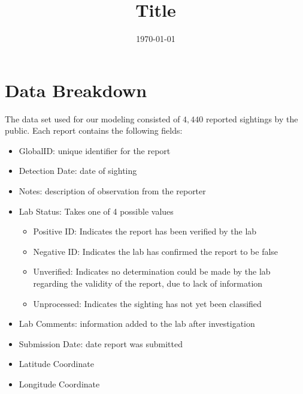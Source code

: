 \documentclass[letterpaper]{article}
\title{Title}
\author{}
\date{\today}
\begin{document}
\pagestyle{fancy}
\rfoot{}    
\cfoot{}
\lfoot{}

\renewcommand{\headrulewidth}{0.4pt}
\renewcommand{\footrulewidth}{0.0pt}

\maketitle

\section{Data Breakdown}
The data set used for our modeling consisted of $4,440$ reported sightings by the public. Each report contains the following fields:


\begin{itemize}
    \item GlobalID: unique identifier for the report
    \item Detection Date: date of sighting 
    \item Notes: description of observation from the reporter
    \item Lab Status: Takes one of 4 possible values
    \begin{itemize}
        \item Positive ID: Indicates the report has been verified by the lab
        \item Negative ID: Indicates the lab has confirmed the report to be false
        \item Unverified: Indicates no determination could be made by the lab regarding the validity of the report, due to lack of information
        \item Unprocessed: Indicates the sighting has not yet been classified
    \end{itemize}
    \item Lab Comments: information added to the lab after investigation
    \item Submission Date: date report was submitted
    \item Latitude Coordinate
    \item Longitude Coordinate
    
\end{itemize}
\end{document}
